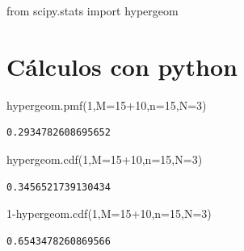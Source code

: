 \documentclass[
  letterpaper,
  DIV=11,
  numbers=noendperiod]{scrreprt}
\newenvironment{Shaded}{\begin{snugshade}}{\end{snugshade}}
\newcommand{\DecValTok}[1]{\textcolor[rgb]{0.68,0.00,0.00}{#1}}
\newcommand{\ImportTok}[1]{\textcolor[rgb]{0.00,0.46,0.62}{#1}}
\newcommand{\NormalTok}[1]{\textcolor[rgb]{0.00,0.23,0.31}{#1}}
\newcommand{\OperatorTok}[1]{\textcolor[rgb]{0.37,0.37,0.37}{#1}}
\begin{document}
\begin{Shaded}
\begin{Highlighting}[]
\ImportTok{from}\NormalTok{ scipy.stats }\ImportTok{import}\NormalTok{ hypergeom}
\end{Highlighting}
\end{Shaded}

\section{Cálculos con python}\label{cuxe1lculos-con-python-11}

\begin{Shaded}
\begin{Highlighting}[]
\NormalTok{hypergeom.pmf(}\DecValTok{1}\NormalTok{,M}\OperatorTok{=}\DecValTok{15}\OperatorTok{+}\DecValTok{10}\NormalTok{,n}\OperatorTok{=}\DecValTok{15}\NormalTok{,N}\OperatorTok{=}\DecValTok{3}\NormalTok{)}
\end{Highlighting}
\end{Shaded}

\begin{verbatim}
0.2934782608695652
\end{verbatim}

\begin{Shaded}
\begin{Highlighting}[]
\NormalTok{hypergeom.cdf(}\DecValTok{1}\NormalTok{,M}\OperatorTok{=}\DecValTok{15}\OperatorTok{+}\DecValTok{10}\NormalTok{,n}\OperatorTok{=}\DecValTok{15}\NormalTok{,N}\OperatorTok{=}\DecValTok{3}\NormalTok{)}
\end{Highlighting}
\end{Shaded}

\begin{verbatim}
0.3456521739130434
\end{verbatim}

\begin{Shaded}
\begin{Highlighting}[]
\DecValTok{1}\OperatorTok{{-}}\NormalTok{hypergeom.cdf(}\DecValTok{1}\NormalTok{,M}\OperatorTok{=}\DecValTok{15}\OperatorTok{+}\DecValTok{10}\NormalTok{,n}\OperatorTok{=}\DecValTok{15}\NormalTok{,N}\OperatorTok{=}\DecValTok{3}\NormalTok{)}
\end{Highlighting}
\end{Shaded}

\begin{verbatim}
0.6543478260869566
\end{verbatim}
\end{document}
